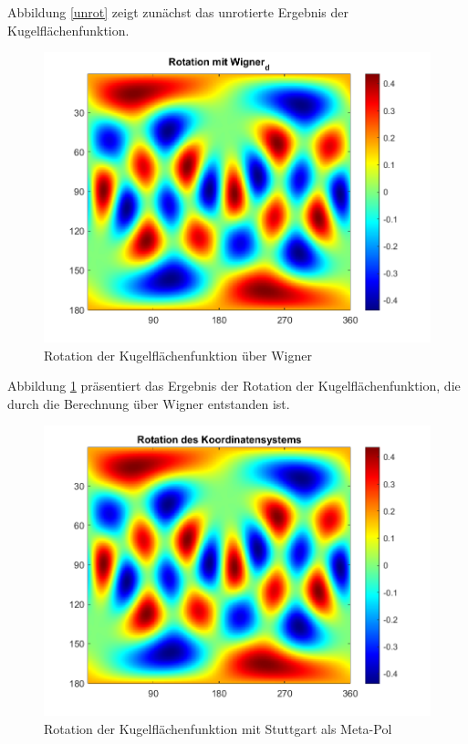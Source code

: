 Abbildung \ref{unrot} zeigt zunächst das unrotierte Ergebnis der Kugelflächenfunktion. 

\begin{figure}[H]
	\centering
	\includegraphics[scale = 0.6]{wigner.png}
	\caption{Rotation der Kugelflächenfunktion über Wigner}
	\label{wigner}
\end{figure}

Abbildung \ref{wigner} präsentiert das Ergebnis der Rotation der Kugelflächenfunktion, die durch die Berechnung über Wigner entstanden ist. 

\begin{figure}[H]
	\centering
	\includegraphics[scale = 0.6]{rotiert.png}
	\caption{Rotation der Kugelflächenfunktion mit Stuttgart als Meta-Pol}
	\label{rot}
\end{figure}

